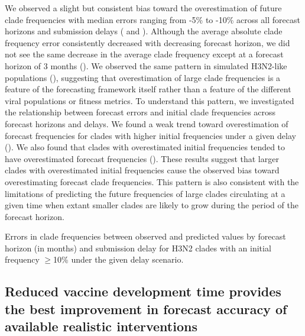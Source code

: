 \documentclass[9pt,lineno]{elife}
\begin{document}
We observed a slight but consistent bias toward the overestimation of future clade frequencies with median errors ranging from -5\% to -10\% across all forecast horizons and submission delays ( and ).
Although the average absolute clade frequency error consistently decreased with decreasing forecast horizon, we did not see the same decrease in the average clade frequency except at a forecast horizon of 3 months ().
We observed the same pattern in simulated H3N2-like populations (), suggesting that overestimation of large clade frequencies is a feature of the forecasting framework itself rather than a feature of the different viral populations or fitness metrics.
To understand this pattern, we investigated the relationship between forecast errors and initial clade frequencies across forecast horizons and delays.
We found a weak trend toward overestimation of forecast frequencies for clades with higher initial frequencies under a given delay ().
We also found that clades with overestimated initial frequencies tended to have overestimated forecast frequencies ().
These results suggest that larger clades with overestimated initial frequencies cause the observed bias toward overestimating forecast clade frequencies.
This pattern is also consistent with the limitations of predicting the future frequencies of large clades circulating at a given time when extant smaller clades are likely to grow during the period of the forecast horizon.

\begin{table}[htb]
  \begin{center}
    
    \caption{Errors in clade frequencies between observed and predicted values by forecast horizon (in months) and submission delay for H3N2 clades with an initial frequency $\geq$10\% under the given delay scenario.}
    \label{tab:h3n2_forecast_clade_frequency_errors}
  \end{center}
\end{table}

\subsection{Reduced vaccine development time provides the best improvement in forecast accuracy of available realistic interventions}
\end{document}
